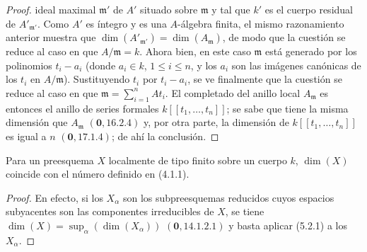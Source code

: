 \begin{proof}
ideal maximal $\mathfrak m'$ de $A'$ situado sobre $\mathfrak m$ y tal que
$k'$ es el cuerpo residual de $A'_{\mathfrak m'}$. Como $A'$ es íntegro y
es una $A$-álgebra finita, el mismo razonamiento anterior muestra que
$\dim(A'_{\mathfrak m'})=\dim(A_{\mathfrak m})$, de modo que la cuestión se reduce
al caso en que $A/\mathfrak m=k$. Ahora bien, en este caso $\mathfrak m$ está
generado por los polinomios $t_i-a_i$ (donde $a_i\in k$, $1\leq i\leq n$, y
los $a_i$ son las imágenes canónicas de los $t_i$ en $A/\mathfrak m$).
Sustituyendo $t_i$ por $t_i-a_i$, se ve finalmente que la cuestión se reduce al
caso en que $\mathfrak m=\sum_{i=1}^nAt_i$. El completado del anillo local
$A_{\mathfrak m}$ es entonces el anillo de series formales
$k[[t_1,\ldots,t_n]]$; se sabe que tiene la misma dimensión que
$A_{\mathfrak m}$ $(\mathbf{0},16.2.4)$ y, por otra parte, la dimensión de
$k[[t_1,\ldots,t_n]]$ es igual a $n$ $(\mathbf{0},17.1.4)$; de ahí la conclusión.
\end{proof}

\begin{corollary}[5.2.2]
\label{IV.2.5.2.2-fr}
Para un preesquema $X$ localmente de tipo finito sobre un cuerpo $k$, $\dim(X)$
coincide con el número definido en \textup{(4.1.1)}.
\end{corollary}

\begin{proof}
En efecto, si los $X_\alpha$ son los subpreesquemas reducidos cuyos espacios
subyacentes son las componentes irreducibles de $X$, se tiene
$\dim(X)=\sup_\alpha(\dim(X_\alpha))$ $(\mathbf{0},14.1.2.1)$ y basta aplicar (5.2.1) a
los $X_\alpha$.
\end{proof}
